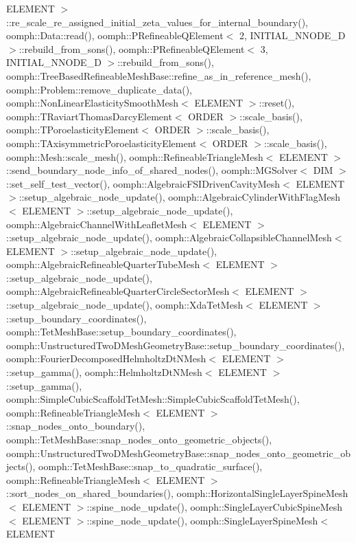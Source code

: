 E\+L\+E\+M\+E\+N\+T $>$\+::re\+\_\+scale\+\_\+re\+\_\+assigned\+\_\+initial\+\_\+zeta\+\_\+values\+\_\+for\+\_\+internal\+\_\+boundary(), oomph\+::\+Data\+::read(), oomph\+::\+P\+Refineable\+Q\+Element$<$ 2, I\+N\+I\+T\+I\+A\+L\+\_\+\+N\+N\+O\+D\+E\+\_\+D $>$\+::rebuild\+\_\+from\+\_\+sons(), oomph\+::\+P\+Refineable\+Q\+Element$<$ 3, I\+N\+I\+T\+I\+A\+L\+\_\+\+N\+N\+O\+D\+E\+\_\+D $>$\+::rebuild\+\_\+from\+\_\+sons(), oomph\+::\+Tree\+Based\+Refineable\+Mesh\+Base\+::refine\+\_\+as\+\_\+in\+\_\+reference\+\_\+mesh(), oomph\+::\+Problem\+::remove\+\_\+duplicate\+\_\+data(), oomph\+::\+Non\+Linear\+Elasticity\+Smooth\+Mesh$<$ E\+L\+E\+M\+E\+N\+T $>$\+::reset(), oomph\+::\+T\+Raviart\+Thomas\+Darcy\+Element$<$ O\+R\+D\+E\+R $>$\+::scale\+\_\+basis(), oomph\+::\+T\+Poroelasticity\+Element$<$ O\+R\+D\+E\+R $>$\+::scale\+\_\+basis(), oomph\+::\+T\+Axisymmetric\+Poroelasticity\+Element$<$ O\+R\+D\+E\+R $>$\+::scale\+\_\+basis(), oomph\+::\+Mesh\+::scale\+\_\+mesh(), oomph\+::\+Refineable\+Triangle\+Mesh$<$ E\+L\+E\+M\+E\+N\+T $>$\+::send\+\_\+boundary\+\_\+node\+\_\+info\+\_\+of\+\_\+shared\+\_\+nodes(), oomph\+::\+M\+G\+Solver$<$ D\+I\+M $>$\+::set\+\_\+self\+\_\+test\+\_\+vector(), oomph\+::\+Algebraic\+F\+S\+I\+Driven\+Cavity\+Mesh$<$ E\+L\+E\+M\+E\+N\+T $>$\+::setup\+\_\+algebraic\+\_\+node\+\_\+update(), oomph\+::\+Algebraic\+Cylinder\+With\+Flag\+Mesh$<$ E\+L\+E\+M\+E\+N\+T $>$\+::setup\+\_\+algebraic\+\_\+node\+\_\+update(), oomph\+::\+Algebraic\+Channel\+With\+Leaflet\+Mesh$<$ E\+L\+E\+M\+E\+N\+T $>$\+::setup\+\_\+algebraic\+\_\+node\+\_\+update(), oomph\+::\+Algebraic\+Collapsible\+Channel\+Mesh$<$ E\+L\+E\+M\+E\+N\+T $>$\+::setup\+\_\+algebraic\+\_\+node\+\_\+update(), oomph\+::\+Algebraic\+Refineable\+Quarter\+Tube\+Mesh$<$ E\+L\+E\+M\+E\+N\+T $>$\+::setup\+\_\+algebraic\+\_\+node\+\_\+update(), oomph\+::\+Algebraic\+Refineable\+Quarter\+Circle\+Sector\+Mesh$<$ E\+L\+E\+M\+E\+N\+T $>$\+::setup\+\_\+algebraic\+\_\+node\+\_\+update(), oomph\+::\+Xda\+Tet\+Mesh$<$ E\+L\+E\+M\+E\+N\+T $>$\+::setup\+\_\+boundary\+\_\+coordinates(), oomph\+::\+Tet\+Mesh\+Base\+::setup\+\_\+boundary\+\_\+coordinates(), oomph\+::\+Unstructured\+Two\+D\+Mesh\+Geometry\+Base\+::setup\+\_\+boundary\+\_\+coordinates(), oomph\+::\+Fourier\+Decomposed\+Helmholtz\+Dt\+N\+Mesh$<$ E\+L\+E\+M\+E\+N\+T $>$\+::setup\+\_\+gamma(), oomph\+::\+Helmholtz\+Dt\+N\+Mesh$<$ E\+L\+E\+M\+E\+N\+T $>$\+::setup\+\_\+gamma(), oomph\+::\+Simple\+Cubic\+Scaffold\+Tet\+Mesh\+::\+Simple\+Cubic\+Scaffold\+Tet\+Mesh(), oomph\+::\+Refineable\+Triangle\+Mesh$<$ E\+L\+E\+M\+E\+N\+T $>$\+::snap\+\_\+nodes\+\_\+onto\+\_\+boundary(), oomph\+::\+Tet\+Mesh\+Base\+::snap\+\_\+nodes\+\_\+onto\+\_\+geometric\+\_\+objects(), oomph\+::\+Unstructured\+Two\+D\+Mesh\+Geometry\+Base\+::snap\+\_\+nodes\+\_\+onto\+\_\+geometric\+\_\+objects(), oomph\+::\+Tet\+Mesh\+Base\+::snap\+\_\+to\+\_\+quadratic\+\_\+surface(), oomph\+::\+Refineable\+Triangle\+Mesh$<$ E\+L\+E\+M\+E\+N\+T $>$\+::sort\+\_\+nodes\+\_\+on\+\_\+shared\+\_\+boundaries(), oomph\+::\+Horizontal\+Single\+Layer\+Spine\+Mesh$<$ E\+L\+E\+M\+E\+N\+T $>$\+::spine\+\_\+node\+\_\+update(), oomph\+::\+Single\+Layer\+Cubic\+Spine\+Mesh$<$ E\+L\+E\+M\+E\+N\+T $>$\+::spine\+\_\+node\+\_\+update(), oomph\+::\+Single\+Layer\+Spine\+Mesh$<$ E\+L\+E\+M\+E\+N\+T 